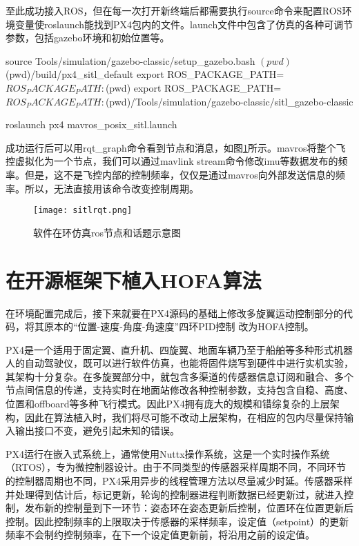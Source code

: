 至此成功接入ROS，但在每一次打开新终端后都需要执行source命令来配置ROS环境变量使roslaunch能找到PX4包内的文件。launch文件中包含了仿真的各种可调节参数，包括gazebo环境和初始位置等。
\begin{codeblock}[language=C]
  source Tools/simulation/gazebo-classic/setup_gazebo.bash $(pwd) $(pwd)/build/px4_sitl_default
  export ROS_PACKAGE_PATH=$ROS_PACKAGE_PATH:$(pwd)
  export ROS_PACKAGE_PATH=$ROS_PACKAGE_PATH:$(pwd)/Tools/simulation/gazebo-classic/sitl_gazebo-classic

  roslaunch px4 mavros_posix_sitl.launch
\end{codeblock}
成功运行后可以用rqt\_graph命令看到节点和消息，如图\ref{sitlrqt}所示。mavros将整个飞控虚拟化为一个节点，我们可以通过mavlink stream命令修改imu等数据发布的频率。但是，这不是飞控内部的控制频率，仅仅是通过mavros向外部发送信息的频率。所以，无法直接用该命令改变控制周期。
\begin{figure}[!h]
  \centering
  \texttt{[image: sitlrqt.png]}
  \caption{软件在环仿真ros节点和话题示意图}
  \label{sitlrqt}
\end{figure}

 \section{在开源框架下植入HOFA算法}
在环境配置完成后，接下来就要在PX4源码的基础上修改多旋翼运动控制部分的代码，将其原本的“位置-速度-角度-角速度”四环PID控制 \cite{px4}改为HOFA控制。

PX4是一个适用于固定翼、直升机、四旋翼、地面车辆乃至于船舶等多种形式机器人的自动驾驶仪，既可以进行软件仿真，也能将固件烧写到硬件中进行实机实验，其架构十分复杂。在多旋翼部分中，就包含多渠道的传感器信息订阅和融合、多个节点间信息的传递，支持实时在地面站修改各种控制参数，支持包含自稳、高度、位置和offboard等多种飞行模式。因此PX4拥有庞大的规模和错综复杂的上层架构，因此在算法植入时，我们将尽可能不改动上层架构，在相应的包内尽量保持输入输出接口不变，避免引起未知的错误。

PX4运行在嵌入式系统上，通常使用Nuttx操作系统，这是一个实时操作系统（RTOS），专为微控制器设计。由于不同类型的传感器采样周期不同，不同环节的控制器周期也不同，PX4采用异步的线程管理方法以尽量减少时延。传感器采样并处理得到估计后，标记更新，轮询的控制器进程判断数据已经更新过，就进入控制，发布新的控制量到下一环节：姿态环在姿态更新后控制，位置环在位置更新后控制。因此控制频率的上限取决于传感器的采样频率，设定值（setpoint）的更新频率不会制约控制频率，在下一个设定值更新前，将沿用之前的设定值。

